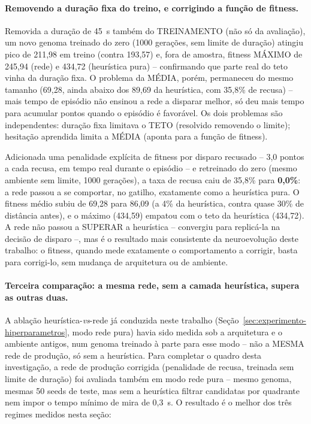 \documentclass[12pt,a4paper]{article}
\begin{document}
\paragraph{Removendo a duração fixa do treino, e corrigindo a função de fitness.}
Removida a duração de 45~s também do TREINAMENTO (não só da avaliação), um novo genoma treinado do
zero (1000 gerações, sem limite de duração) atingiu pico de 211,98 em treino (contra 193,57) e,
fora de amostra, fitness MÁXIMO de 245,94 (rede) e 434,72 (heurística pura) -- confirmando que parte
real do teto vinha da duração fixa. O problema da MÉDIA, porém, permaneceu do mesmo tamanho (69,28,
ainda abaixo dos 89,69 da heurística, com 35,8\% de recusa) -- mais tempo de episódio não ensinou a
rede a disparar melhor, só deu mais tempo para acumular pontos quando o episódio é favorável. Os
dois problemas são independentes: duração fixa limitava o TETO (resolvido removendo o limite);
hesitação aprendida limita a MÉDIA (aponta para a função de fitness).

Adicionada uma penalidade explícita de fitness por disparo recusado -- 3,0 pontos a cada recusa, em
tempo real durante o episódio -- e retreinado do zero (mesmo
ambiente sem limite, 1000 gerações), a taxa de recusa caiu de 35,8\% para \textbf{0,0\%}: a rede
passou a se comportar, no gatilho, exatamente como a heurística pura. O fitness médio subiu de 69,28
para 86,09 (a 4\% da heurística, contra quase 30\% de distância antes), e o máximo (434,59) empatou
com o teto da heurística (434,72). A rede não passou a SUPERAR a heurística -- convergiu para
replicá-la na decisão de disparo --, mas é o resultado mais consistente da neuroevolução deste
trabalho: o fitness, quando mede exatamente o comportamento a corrigir, basta para corrigi-lo, sem
mudança de arquitetura ou de ambiente.

\paragraph{Terceira comparação: a mesma rede, sem a camada heurística, supera as outras duas.}
A ablação heurística-\textit{vs}-rede já conduzida neste trabalho (Seção~\ref{sec:experimento-hiperparametros},
modo rede pura) havia sido medida sob a arquitetura e o ambiente antigos, num genoma treinado
à parte para esse modo -- não a MESMA rede de produção, só sem a heurística. Para completar o quadro
desta investigação, a rede de produção corrigida (penalidade de recusa, treinada sem limite de
duração) foi avaliada também em modo rede pura -- mesmo genoma, mesmas 50 seeds de teste, mas sem
a heurística filtrar candidatas por quadrante nem impor o tempo mínimo de mira de 0,3~s. O resultado
é o melhor dos três regimes medidos nesta seção:
\end{document}
